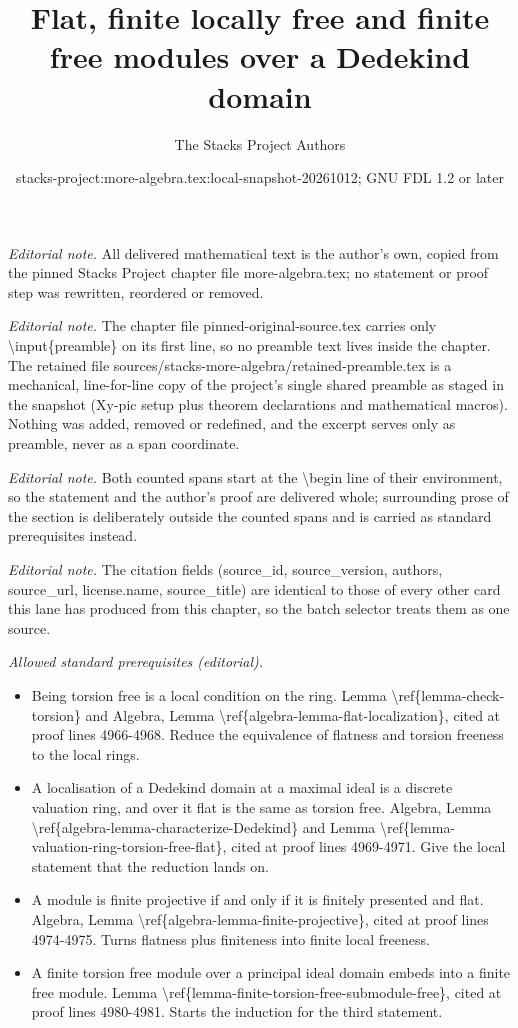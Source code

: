 \documentclass[10pt,a4paper]{amsart}
\title{Flat, finite locally free and finite free modules over a Dedekind domain}
\author{The Stacks Project Authors}
\date{stacks-project:more-algebra.tex:local-snapshot-20261012; GNU FDL 1.2 or later}
\theoremstyle{plain}
\theoremstyle{definition}
\theoremstyle{remark}
\numberwithin{equation}{subsection}
\begin{document}
\maketitle
\setcounter{subsection}{1}
\noindent\textit{Editorial note.} All delivered mathematical text is the author's own, copied from the pinned Stacks Project chapter file more-algebra.tex; no statement or proof step was rewritten, reordered or removed.\par\medskip
\noindent\textit{Editorial note.} The chapter file pinned-original-source.tex carries only \textbackslash{}input\{preamble\} on its first line, so no preamble text lives inside the chapter. The retained file sources/stacks-more-algebra/retained-preamble.tex is a mechanical, line-for-line copy of the project's single shared preamble as staged in the snapshot (Xy-pic setup plus theorem declarations and mathematical macros). Nothing was added, removed or redefined, and the excerpt serves only as preamble, never as a span coordinate.\par\medskip
\noindent\textit{Editorial note.} Both counted spans start at the \textbackslash{}begin line of their environment, so the statement and the author's proof are delivered whole; surrounding prose of the section is deliberately outside the counted spans and is carried as standard prerequisites instead.\par\medskip
\noindent\textit{Editorial note.} The citation fields (source\_id, source\_version, authors, source\_url, license.name, source\_title) are identical to those of every other card this lane has produced from this chapter, so the batch selector treats them as one source.\par\medskip
\noindent\textit{Allowed standard prerequisites (editorial).}\begin{itemize}
\item Being torsion free is a local condition on the ring. Lemma \textbackslash{}ref\{lemma-check-torsion\} and Algebra, Lemma \textbackslash{}ref\{algebra-lemma-flat-localization\}, cited at proof lines 4966-4968. Reduce the equivalence of flatness and torsion freeness to the local rings.
\item A localisation of a Dedekind domain at a maximal ideal is a discrete valuation ring, and over it flat is the same as torsion free. Algebra, Lemma \textbackslash{}ref\{algebra-lemma-characterize-Dedekind\} and Lemma \textbackslash{}ref\{lemma-valuation-ring-torsion-free-flat\}, cited at proof lines 4969-4971. Give the local statement that the reduction lands on.
\item A module is finite projective if and only if it is finitely presented and flat. Algebra, Lemma \textbackslash{}ref\{algebra-lemma-finite-projective\}, cited at proof lines 4974-4975. Turns flatness plus finiteness into finite local freeness.
\item A finite torsion free module over a principal ideal domain embeds into a finite free module. Lemma \textbackslash{}ref\{lemma-finite-torsion-free-submodule-free\}, cited at proof lines 4980-4981. Starts the induction for the third statement.
\end{itemize}\medskip
\end{document}
